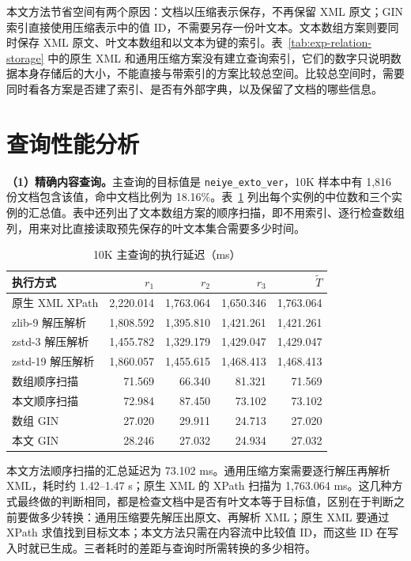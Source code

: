 本文方法节省空间有两个原因：文档以压缩表示保存，不再保留 XML 原文；GIN 索引直接使用压缩表示中的值 ID，不需要另存一份叶文本。文本数组方案则要同时保存 XML 原文、叶文本数组和以文本为键的索引。表~\ref{tab:exp-relation-storage} 中的原生 XML 和通用压缩方案没有建立查询索引，它们的数字只说明数据本身存储后的大小，不能直接与带索引的方案比较总空间。比较总空间时，需要同时看各方案是否建了索引、是否有外部字典，以及保留了文档的哪些信息。

\section{查询性能分析}
\textbf{（1）精确内容查询。}主查询的目标值是 \texttt{neiye\_exto\_ver}，10K 样本中有 1,816 份文档包含该值，命中文档比例为 18.16\%。表~\ref{tab:query-latency} 列出每个实例的中位数和三个实例的汇总值。表中还列出了文本数组方案的顺序扫描，即不用索引、逐行检查数组列，用来对比直接读取预先保存的叶文本集合需要多少时间。
\begin{table}[htbp]
\centering\small
\caption{10K 主查询的执行延迟（ms）}
\label{tab:query-latency}
\begin{tabular}{lrrrr}
\toprule
执行方式 & $r_1$ & $r_2$ & $r_3$ & $\widetilde{T}$ \\
\midrule
原生 XML XPath & 2,220.014 & 1,763.064 & 1,650.346 & 1,763.064 \\
zlib-9 解压解析 & 1,808.592 & 1,395.810 & 1,421.261 & 1,421.261 \\
zstd-3 解压解析 & 1,455.782 & 1,329.179 & 1,429.047 & 1,429.047 \\
zstd-19 解压解析 & 1,860.057 & 1,455.615 & 1,468.413 & 1,468.413 \\
数组顺序扫描 & 71.569 & 66.340 & 81.321 & 71.569 \\
本文顺序扫描 & 72.984 & 87.450 & 73.102 & 73.102 \\
数组 GIN & 27.020 & 29.911 & 24.713 & 27.020 \\
本文 GIN & 28.246 & 27.032 & 24.934 & 27.032 \\
\bottomrule
\end{tabular}
\end{table}

本文方法顺序扫描的汇总延迟为 73.102 ms。通用压缩方案需要逐行解压再解析 XML，耗时约 1.42--1.47 s；原生 XML 的 XPath 扫描为 1,763.064 ms。这几种方式最终做的判断相同，都是检查文档中是否有叶文本等于目标值，区别在于判断之前要做多少转换：通用压缩要先解压出原文、再解析 XML；原生 XML 要通过 XPath 求值找到目标文本；本文方法只需在内容流中比较值 ID，而这些 ID 在写入时就已生成。三者耗时的差距与查询时所需转换的多少相符。

